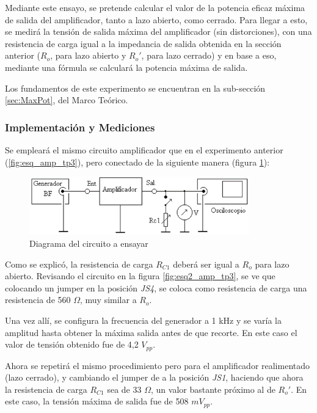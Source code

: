 
Mediante este ensayo, se pretende calcular el valor de la potencia eficaz máxima de salida del amplificador, tanto a lazo abierto, como cerrado. Para llegar a esto, se medirá la tensión de salida máxima del amplificador (sin distorciones), con una resistencia de carga igual a la impedancia de salida obtenida en la sección anterior ($R_o$, para lazo abierto y $R_o'$, para lazo cerrado) y en base a eso, mediante una fórmula se calculará la potencia máxima de salida. 

Los fundamentos de este experimento se encuentran en la sub-sección \ref{sec:MaxPot}, del Marco Teórico.


\subsubsection{Implementación y Mediciones}

Se empleará el mismo circuito amplificador que en el experimento anterior (\ref{fig:esq_amp_tp3}), pero conectado de la siguiente manera (figura \ref{fig:circ6}):

\begin{figure}[H]
    \centering
    \includegraphics[width=0.85\textwidth]{Imagenes/circ6.png}
    \caption{Diagrama del circuito a ensayar}
    \label{fig:circ6}
\end{figure}

Como se explicó, la resistencia de carga $R_{C1}$ deberá ser igual a $R_o$ para lazo abierto. Revisando el circuito en la figura \ref{fig:esq2_amp_tp3}, se ve que colocando un jumper en la posición \textit{JS4}, se coloca como resistencia de carga una resistencia de 560 $\Omega$, muy similar a $R_o$. 

Una vez allí, se configura la frecuencia del generador a 1 kHz y se varía la amplitud hasta obtener la máxima salida antes de que recorte. En este caso el valor de tensión obtenido fue de 4,2 $V_{pp}$. 

Ahora se repetirá el mismo procedimiento pero para el amplificador realimentado (lazo cerrado), y cambiando el jumper de a la posición \textit{JS1}, haciendo que ahora la resistencia de carga $R_{C1}$ sea de 33 $\Omega$, un valor bastante próximo al de $R_o'$. En este caso, la tensión máxima de salida fue de 508 $mV_{pp}$.


